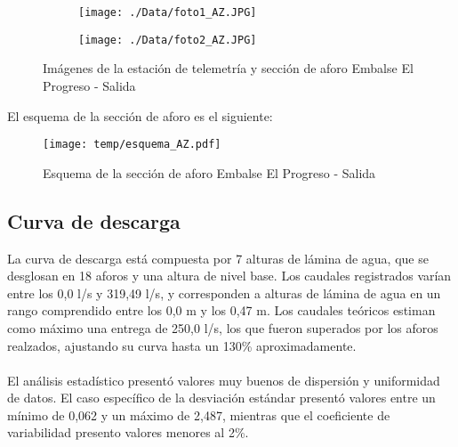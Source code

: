 \documentclass[]{article}
\begin{document}
\begin{figure}[H]
  \centering
\begin{subfigure}{.49\textwidth}
  \texttt{[image: ./Data/foto1\_AZ.JPG]}
\end{subfigure}
\hfill
\begin{subfigure}{.49\textwidth}
  \texttt{[image: ./Data/foto2\_AZ.JPG]}
\end{subfigure}
\caption{Imágenes de la estación de telemetría y sección de aforo Embalse El Progreso - Salida }
\label{fig:fotos_26}
\end{figure}

El esquema de la sección de aforo es el siguiente:

\begin{figure}[H]
  \centering
  \texttt{[image: temp/esquema\_AZ.pdf]}
\caption{Esquema de la sección de aforo Embalse El Progreso - Salida }
\label{fig:Esquema_AZ}
\end{figure}

\subsection{Curva de descarga}\label{curva-de-descarga-25}

La curva de descarga está compuesta por 7 alturas de lámina de agua, que se desglosan en 18 aforos y una altura de nivel base. Los caudales registrados varían entre los 0,0 l/s y 319,49 l/s, y corresponden a alturas de lámina de agua en un rango comprendido entre los 0,0 m y los 0,47 m. Los caudales teóricos estiman como máximo una entrega de 250,0 l/s, los que fueron superados por los aforos realzados, ajustando su curva hasta un 130\% aproximadamente.\\
\\
El análisis estadístico presentó valores muy buenos de dispersión y uniformidad de datos. El caso específico de la desviación estándar presentó valores entre un mínimo de 0,062 y un máximo de 2,487, mientras que el coeficiente de variabilidad presento valores menores al 2\%.
\end{document}
